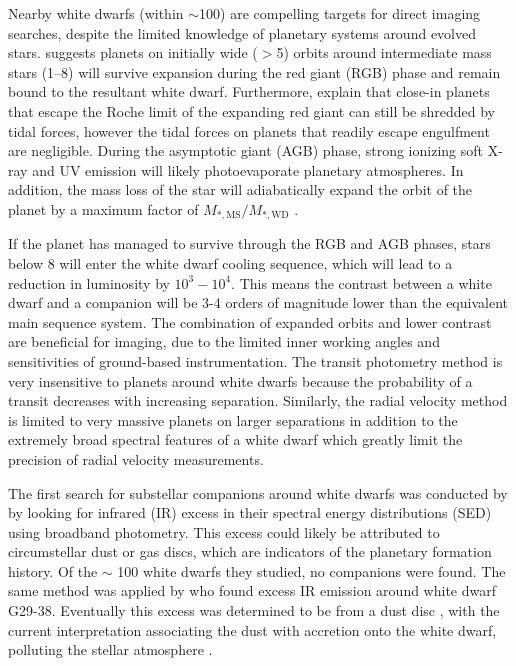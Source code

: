 \documentclass[twocolumn]{aastex631}
\begin{document}
Nearby white dwarfs (within $\sim$\qty{100}{\parsec}) are compelling targets for direct imaging searches, despite the limited knowledge of planetary systems around evolved stars. \cite{burleigh_imaging_2002} suggests planets on initially wide ($>$\qty{5}{\au}) orbits around intermediate mass stars (\qtyrange{1}{8}{\solarmass}) will survive expansion during the red giant (RGB) phase and remain bound to the resultant white dwarf. Furthermore, \citet{nordhaus_orbits_2013} explain that close-in planets that escape the Roche limit of the expanding red giant can still be shredded by tidal forces, however the tidal forces on planets that readily escape engulfment are negligible. During the asymptotic giant (AGB) phase, strong ionizing soft X-ray and UV emission will likely photoevaporate planetary atmospheres. In addition, the mass loss of the star will adiabatically expand the orbit of the planet by a maximum factor of $M_{*,\mathrm{MS}}/M_{*,\mathrm{WD}}$ \citep{jeans_cosmogonic_1924}.

If the planet has managed to survive through the RGB and AGB phases, stars below \qty{8}{\solarmass} will enter the white dwarf cooling sequence, which will lead to a reduction in luminosity by $10^3-10^4$. This means the contrast between a white dwarf and a companion will be 3-4 orders of magnitude lower than the equivalent main sequence system. The combination of expanded orbits and lower contrast are beneficial for imaging, due to the limited inner working angles and sensitivities of ground-based instrumentation. The transit photometry method is very insensitive to planets around white dwarfs because the probability of a transit decreases with increasing separation. Similarly, the radial velocity method is limited to very massive planets on larger separations in addition to the extremely broad spectral features of a white dwarf which greatly limit the precision of radial velocity measurements.

The first search for substellar companions around white dwarfs was conducted by \citet{probst_infrared_1983} by looking for infrared (IR) excess in their spectral energy distributions (SED) using broadband photometry. This excess could likely be attributed to circumstellar dust or gas discs, which are indicators of the planetary formation history. Of the $\sim$ 100 white dwarfs they studied, no companions were found. The same method was applied by \citet{zuckerman_excess_1987} who found excess IR emission around white dwarf G29-38. Eventually this excess was determined to be from a dust disc \citep{telesco_observations_1990}, with the current interpretation associating the dust with accretion onto the white dwarf, polluting the stellar atmosphere \citep{koester_metals_1997}.
\end{document}
